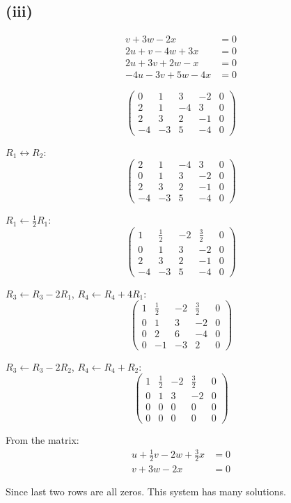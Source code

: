 \subsection*{(iii)}
\begin{align*}
	v + 3w - 2x        & = 0 \\
	2u + v - 4w + 3x   & = 0 \\
	2u + 3v + 2w - x   & = 0 \\
	-4u - 3v + 5w - 4x & = 0
\end{align*}

\[
	\left(\begin{array}{cccc|c}
			0  & 1  & 3  & -2 & 0 \\
			2  & 1  & -4 & 3  & 0 \\
			2  & 3  & 2  & -1 & 0 \\
			-4 & -3 & 5  & -4 & 0
		\end{array}\right)
\]

$R_1 \leftrightarrow R_2$:
\[
	\left(\begin{array}{cccc|c}
			2  & 1  & -4 & 3  & 0 \\
			0  & 1  & 3  & -2 & 0 \\
			2  & 3  & 2  & -1 & 0 \\
			-4 & -3 & 5  & -4 & 0
		\end{array}\right)
\]

$R_1 \leftarrow \frac{1}{2}R_1$:
\[
	\left(\begin{array}{cccc|c}
			1  & \frac{1}{2} & -2 & \frac{3}{2} & 0 \\
			0  & 1           & 3  & -2          & 0 \\
			2  & 3           & 2  & -1          & 0 \\
			-4 & -3          & 5  & -4          & 0
		\end{array}\right)
\]

$R_3 \leftarrow R_3 - 2R_1$, $R_4 \leftarrow R_4 + 4R_1$:
\[
	\left(\begin{array}{cccc|c}
			1 & \frac{1}{2} & -2 & \frac{3}{2} & 0 \\
			0 & 1           & 3  & -2          & 0 \\
			0 & 2           & 6  & -4          & 0 \\
			0 & -1          & -3 & 2           & 0
		\end{array}\right)
\]

$R_3 \leftarrow R_3 - 2R_2$, $R_4 \leftarrow R_4 + R_2$:
\[
	\left(\begin{array}{cccc|c}
			1 & \frac{1}{2} & -2 & \frac{3}{2} & 0 \\
			0 & 1           & 3  & -2          & 0 \\
			0 & 0           & 0  & 0           & 0 \\
			0 & 0           & 0  & 0           & 0
		\end{array}\right)
\]

From the matrix:
\begin{align*}
	u + \frac{1}{2}v - 2w + \frac{3}{2}x & = 0 \\
	v + 3w - 2x                          & = 0
\end{align*}

Since last two rows are all zeros. This system has many solutions.